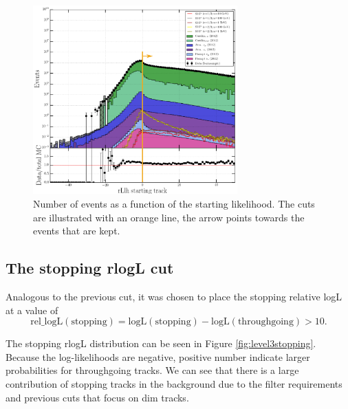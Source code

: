 \begin{figure}[t]
\centering
\includegraphics[width=0.7\textwidth]{chapter8/img/L3_zenithcut_gr_1p4835298642_rloglcut_less_15_npecut_less_50_1D_stack_finitereco_rllh_starting_new.png}
\caption{Number of events as a function of the starting likelihood. The cuts are illustrated with an orange line, the arrow points towards the events that are kept.}
\label{fig:level3starting}
\end{figure}

\subsection{The stopping rlogL cut}
Analogous to the previous cut, it was chosen to place the stopping relative logL at a value of
\begin{equation}
\textrm{rel\_logL}(\textrm{stopping}) = \textrm{logL}(\textrm{stopping}) - \textrm{logL}(\textrm{throughgoing}) > 10. 
\end{equation}

The stopping rlogL distribution can be seen in Figure \ref{fig:level3stopping}. Because the log-likelihoods are negative, positive number indicate larger probabilities for throughgoing tracks. We can see that there is a large contribution of stopping tracks in the background due to the filter requirements and previous cuts that focus on dim tracks.

